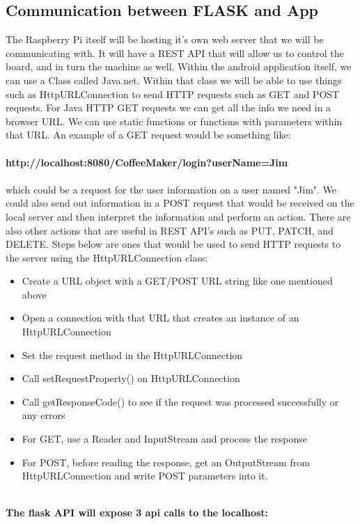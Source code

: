 \documentclass[conference]{IEEEtran}
\begin{document}
\subsection{Communication between FLASK and App}
The Raspberry Pi itself will be hosting it's own web server that we will be communicating with. It will have a REST API that will allow us to control the board, and in turn the machine as well. Within the android application itself, we can use a Class called Java.net. Within that class we will be able to use things such as HttpURLConnection to send HTTP requests such as GET and POST requests. For Java HTTP GET requests we can get all the info we need in a browser URL. We can use static functions or functions with parameters within that URL. An example of a GET request would be something like: \\ \\ \textbf{http://localhost:8080/CoffeeMaker/login?userName=Jim}\\ \\which could be a request for the user information on a user named "Jim". We could also send out information in a POST request that would be received on the local server and then interpret the information and perform an action. There are also other actions that are useful in REST API's such as PUT, PATCH, and DELETE. Steps below are ones that would be used to send HTTP requests to the server using the HttpURLConnection class:
\begin{itemize}
\item Create a URL object with a GET/POST URL string like one mentioned above
\item Open a connection with that URL that creates an instance of an HttpURLConnection
\item Set the request method in the HttpURLConnection
\item Call setRequestProperty() on HttpURLConnection
\item Call getResponseCode() to see if the request was processed successfully or any errors
\item For GET, use a Reader and InputStream and process the response
\item For POST, before reading the response, get an OutputStream from HttpURLConnection and write POST parameters into it.
\end{itemize} 
\ \\
\textbf{The flask API will expose 3 api calls to the localhost:} \\ 
\end{document}
